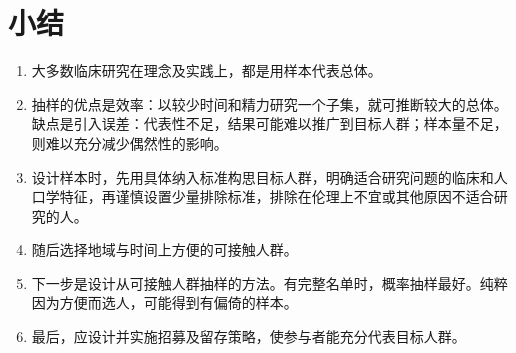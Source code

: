 \section{小结}
\begin{enumerate}
\item 大多数临床研究在理念及实践上，都是用样本代表总体。
\item 抽样的优点是效率：以较少时间和精力研究一个子集，就可推断较大的总体。缺点是引入误差：代表性不足，结果可能难以推广到目标人群；样本量不足，则难以充分减少偶然性的影响。
\item 设计样本时，先用具体纳入标准构思目标人群，明确适合研究问题的临床和人口学特征，再谨慎设置少量排除标准，排除在伦理上不宜或其他原因不适合研究的人。
\item 随后选择地域与时间上方便的可接触人群。
\item 下一步是设计从可接触人群抽样的方法。有完整名单时，概率抽样最好。纯粹因为方便而选人，可能得到有偏倚的样本。
\item 最后，应设计并实施招募及留存策略，使参与者能充分代表目标人群。
\end{enumerate}
